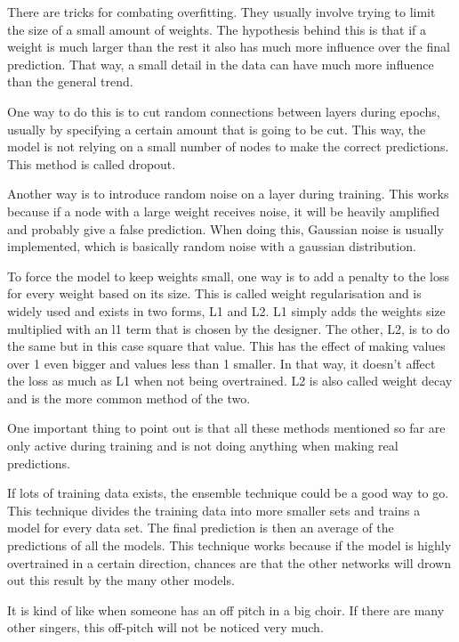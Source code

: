 \cite{overtraining}

There are tricks for combating overfitting. They usually involve trying to limit the size of a small amount of weights.
The hypothesis behind this is that if a weight is much larger than the rest it also has much more influence over the final prediction. That way, a small detail in the data can have much more influence than the general trend.

One way to do this is to cut random connections between layers during epochs, usually by specifying a certain amount that is going to be cut.
This way, the model is not relying on a small number of nodes to make the correct predictions. This method is called dropout.

Another way is to introduce random noise on a layer during training. This works because if a node with a large weight receives noise, it will be heavily amplified and probably give a false prediction.
When doing this, Gaussian noise is usually implemented, which is basically random noise with a gaussian distribution.

To force the model to keep weights small, one way is to add a penalty to the loss for every weight based on its size. 
This is called weight regularisation and is widely used and exists in two forms, L1 and L2.
L1 simply adds the weights size multiplied with an l1 term that is chosen by the designer.
The other, L2, is to do the same but in this case square that value. This has the effect of making values over 1 even bigger and values less than 1 smaller.
In that way, it doesn't affect the loss as much as L1 when not being overtrained. L2 is also called weight decay and is the more common method of the two.

One important thing to point out is that all these methods mentioned so far are only active during training and is not doing anything when making real predictions.


If lots of training data exists, the ensemble technique could be a good way to go. This technique divides the training data into more smaller sets and trains a model for every data set.
The final prediction is then an average of the predictions of all the models. This technique works because if the model is highly overtrained in a certain direction, chances are that the other networks will drown out this result by the many other models.

It is kind of like when someone has an off pitch in a big choir. If there are many other singers, this off-pitch will not be noticed very much.

